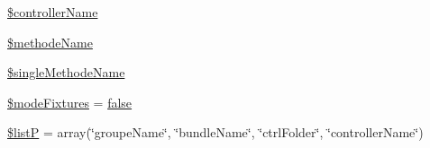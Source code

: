\begin{DoxyCompactItemize}
\item 
\hyperlink{class_acme_group_1_1services_1_1aetools_1_1aetools_a8c20fa0117f27cbab8375da859edb403}{\$controller\+Name}
\item 
\hyperlink{class_acme_group_1_1services_1_1aetools_1_1aetools_a64dc7c859cd8d8fe128d4e65575243e0}{\$methode\+Name}
\item 
\hyperlink{class_acme_group_1_1services_1_1aetools_1_1aetools_a6daf08c1c981f0466cc39f51ac45e67a}{\$single\+Methode\+Name}
\item 
\hyperlink{class_acme_group_1_1services_1_1aetools_1_1aetools_adb99f953b517319d9a42a339fb8e0164}{\$mode\+Fixtures} = \hyperlink{validate_8js_a5df37b7f02e5cdc7d9412b7f872b8e01}{false}
\item 
\hyperlink{class_acme_group_1_1services_1_1aetools_1_1aetools_a2fcde1c7470b2f1b65fbcb69f9332f39}{\$list\+P} = array(\char`\"{}groupe\+Name\char`\"{}, \char`\"{}bundle\+Name\char`\"{}, \char`\"{}ctrl\+Folder\char`\"{}, \char`\"{}controller\+Name\char`\"{})
\end{DoxyCompactItemize}


